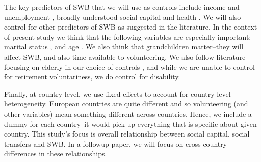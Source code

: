 \documentclass[10pt, letterpaper]{article}
\begin{document}
\begin{spacing}{1.4}


The key predictors of SWB that we will use as controls include income and
unemployment \citep[][]{ditella01moa,ditella01mob,ditella06m}, broadly
understood social
capital and health \citep{blanchflower11,dolan08al,bonsang12}. %
We will also control for other predictors of SWB as suggested in the 
literature. In the context of present study we think that the following
variables are especially important: marital status
\citep[e.g.,][]{myers00,diener04s}, and age \citep{ferring10}. We also think
that grandchildren matter--they will affect SWB, and also time available to volunteering.
%
We also follow literature focusing on elderly in our choice of controls
\citep[e.g.,][]{meier2008volunteering,bonsang12,bender12,ferring10}, and while
we are unable to control for retirement voluntariness, we do control for
disability.

Finally, at country level, we use fixed effects to account for country-level
heterogeneity.
European countries are quite different and so volunteering (and other variables) mean something
different across countries.  Hence, we include a dummy for each country--it would pick up
everything that is specific about given country. This study's focus is overall
relationship between social capital, social transfers and SWB. In a followup
paper, we will focus on cross-country differences in these relationships. 



\end{spacing}
\end{document}
